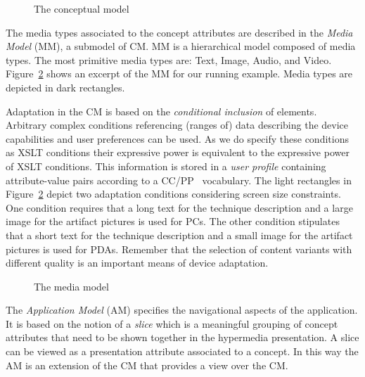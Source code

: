 \documentclass[oribibl]{llncs}
\begin{document}
\begin{figure}[h]
\centering
{}
\caption{The conceptual model}
\label{fig:cm}
\end{figure}

The media types associated to the concept attributes are described in the
\emph{Media Model} (MM), a submodel of CM. MM is a hierarchical model composed of
media types. The most primitive media types are: Text, Image, Audio, and Video.  
Figure~\ref{fig:mm} shows an excerpt of the MM for our running example.
Media types are depicted in dark rectangles.

Adaptation in the CM is based on the \emph{conditional inclusion} of elements. 
Arbitrary complex conditions referencing (ranges of) data describing the 
device capabilities and user preferences can be used. As we do specify 
these conditions as XSLT conditions their expressive power is equivalent 
to the expressive power of XSLT conditions.
This information is stored in a \emph{user profile} containing attribute-value pairs according to a CC/PP~\cite{ccpp} vocabulary. 
The light rectangles in Figure~\ref{fig:mm} depict two adaptation conditions considering screen size constraints. 
One condition
requires that a long text for the technique description and a large image for the
artifact pictures is used for PCs. 
The other condition stipulates that a short text for the technique description and a small image for 
the artifact pictures is used for PDAs.
Remember that the selection of content variants with different quality is an important means of device adaptation.

\begin{figure}[h]
\centering
{}
\caption{The media model}
\label{fig:mm}
\end{figure}


The \emph{Application Model} (AM) specifies the navigational aspects of the
application. 
It is based on the notion of a \emph{slice} which is a meaningful
grouping of concept attributes that need to be shown together in the
hypermedia presentation. 
A slice can be viewed as a presentation attribute associated to 
a concept. 
In this way the AM is an extension of the CM that provides a view over the CM.
\end{document}
